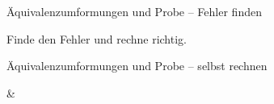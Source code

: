 \begin{aufgabe}{Äquivalenzumformungen und Probe – Fehler finden}
\begin{teile}
\teil Finde den Fehler und rechne richtig. 
\end{teile}
\end{aufgabe}

\begin{aufgabe}{Äquivalenzumformungen und Probe – selbst rechnen}
\begin{gleichungsraster}[2]
 & \\
\end{gleichungsraster}
\end{aufgabe}
